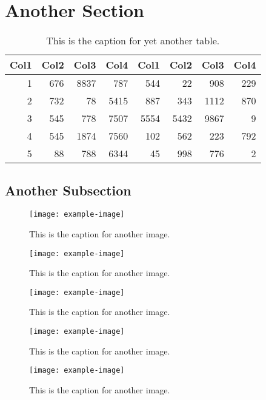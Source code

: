 \section{Another Section}
\lipsum[1-2]
\begin{table}
	\centering
	\begin{tabular}{r r r r r r r r}
		Col1 & Col2 & Col3 & Col4 & Col1 & Col2 & Col3 & Col4 \\
		\hline
		1    & 676  & 8837 & 787  & 544  & 22   & 908  & 229  \\
		2    & 732  & 78   & 5415 & 887  & 343  & 1112 & 870  \\
		3    & 545  & 778  & 7507 & 5554 & 5432 & 9867 & 9    \\
		4    & 545  & 1874 & 7560 & 102  & 562  & 223  & 792  \\
		5    & 88   & 788  & 6344 & 45   & 998  & 776  & 2    \\
		\hline
	\end{tabular}
	\caption{This is the caption for yet another table.}
\end{table}

\subsection{Another Subsection}
\lipsum[3-5]
\begin{figure}
	\centering
	\texttt{[image: example-image]}
	\caption{This is the caption for another image.}
\end{figure}
\begin{figure}
	\centering
	\texttt{[image: example-image]}
	\caption{This is the caption for another image.}
\end{figure}
\begin{figure}
	\centering
	\texttt{[image: example-image]}
	\caption{This is the caption for another image.}
\end{figure}
\begin{figure}
	\centering
	\texttt{[image: example-image]}
	\caption{This is the caption for another image.}
\end{figure}
\begin{figure}
	\centering
	\texttt{[image: example-image]}
	\caption{This is the caption for another image.}
\end{figure}

